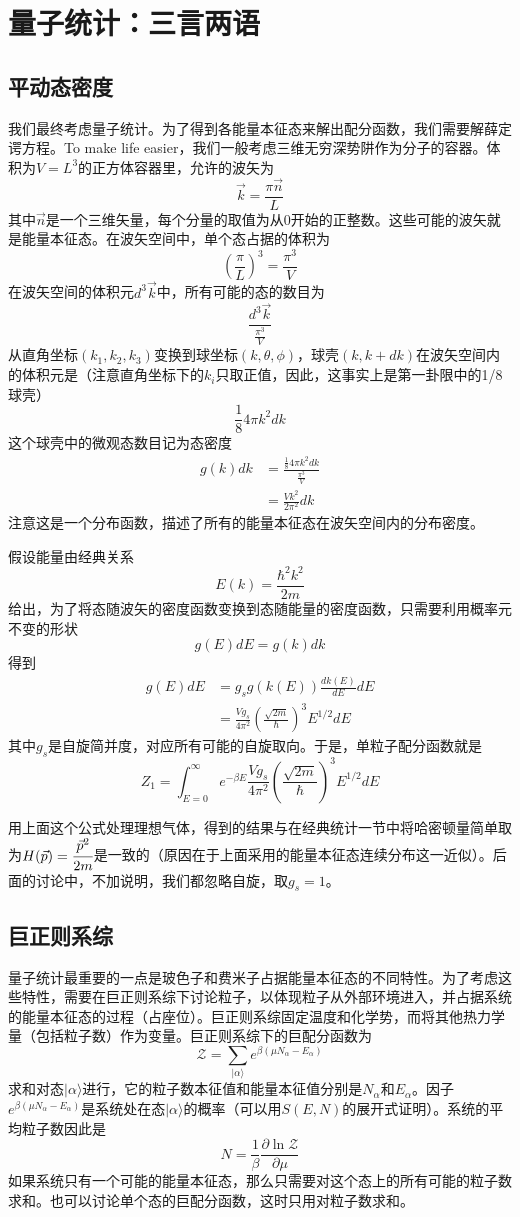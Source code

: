 \documentclass[a4paper,11pt]{ctexart}
\newcommand{\beq}{\begin{equation}}
\newcommand{\eeq}{\end{equation}}
\newcommand{\bea}{\begin{equation}\begin{aligned}}
\newcommand{\eea}{\end{aligned}\end{equation}}
\newcommand{\red}{\color{red}}
\newcommand{\grandz}{\mathcal{Z}}
\begin{document}
\section{量子统计：三言两语}
\subsection{平动态密度}
我们最终考虑量子统计。为了得到各能量本征态来解出配分函数，我们需要解薛定谔方程。To make life easier，我们一般考虑三维无穷深势阱作为分子的容器。体积为$V = L^3$的正方体容器里，允许的波矢为
\beq
\vec{k} = \frac{\pi \vec{n}}{L}
\eeq
其中$\vec{n}$是一个三维矢量，每个分量的取值为从0开始的正整数。这些可能的波矢就是能量本征态。在波矢空间中，单个态占据的体积为
\beq
\left(\frac{\pi}{L}\right)^3 = \frac{\pi^3}{V}
\eeq
在波矢空间的体积元$d^3\vec{k}$中，所有可能的态的数目为
\beq
\frac{d^3\vec{k}}{\frac{\pi^3}{V}}
\eeq
从直角坐标$(k_1,k_2,k_3)$变换到球坐标$(k,\theta,\phi)$，球壳$(k,k+dk)$在波矢空间内的体积元是（注意直角坐标下的$k_i$只取正值，因此，这事实上是第一卦限中的1/8球壳）
\beq
\frac{1}{8} 4\pi k^2 dk
\eeq
这个球壳中的微观态数目记为{\red 态密度}
\bea
g(k)dk &= \frac{\frac{1}{8} 4\pi k^2 dk}{\frac{\pi^3}{V}} \\
&= \frac{Vk^2}{2\pi^2}dk
\eea
注意这是一个分布函数，描述了所有的能量本征态在波矢空间内的分布密度。
\par
假设能量由经典关系
\beq
E(k) = \frac{\hbar^2 k^2}{2m}
\eeq
给出，为了将态随波矢的密度函数变换到态随能量的密度函数，只需要利用概率元不变的形状
\beq
g(E)dE = g(k) dk
\eeq
得到
\bea
g(E)dE &= g_s g(k(E)) \frac{dk(E)}{dE} dE \\
&= \frac{Vg_s}{4\pi^2} \left(\frac{\sqrt{2m}}{\hbar}\right)^3 E^{1/2} dE
\eea
其中$g_s$是自旋简并度，对应所有可能的自旋取向。于是，单粒子配分函数就是
\beq
Z_1 = \int_{E=0}^\infty e^{-\beta E}\frac{Vg_s}{4\pi^2} \left(\frac{\sqrt{2m}}{\hbar}\right)^3 E^{1/2} dE
\eeq
\par
用上面这个公式处理理想气体，得到的结果与在经典统计一节中将哈密顿量简单取为$H(\vec{p})= \cfrac{\vec{p}^2}{2m}$是一致的（原因在于上面采用的能量本征态连续分布这一近似）。后面的讨论中，不加说明，我们都忽略自旋，取$g_s = 1$。
\subsection{巨正则系综}
量子统计最重要的一点是玻色子和费米子占据能量本征态的不同特性。为了考虑这些特性，需要在巨正则系综下讨论粒子，以体现粒子从外部环境进入，并占据系统的能量本征态的过程（占座位）。巨正则系综固定温度和化学势，而将其他热力学量（包括粒子数）作为变量。巨正则系综下的巨配分函数为
\beq
\grandz = \sum_{|\alpha \rangle}e^{\beta(\mu N_\alpha - E_\alpha)}
\eeq
求和对态$|\alpha \rangle$进行，它的粒子数本征值和能量本征值分别是$N_\alpha$和$E_\alpha$。因子$e^{\beta(\mu N_\alpha - E_\alpha)}$是系统处在态$|\alpha \rangle$的概率（可以用$S(E,N)$的展开式证明）。系统的平均粒子数因此是
\beq
N = \frac{1}{\beta} \frac{\partial \ln \grandz}{\partial \mu}
\eeq
如果系统只有一个可能的能量本征态，那么只需要对这个态上的所有可能的粒子数求和。也可以讨论单个态的巨配分函数，这时只用对粒子数求和。
\end{document}
